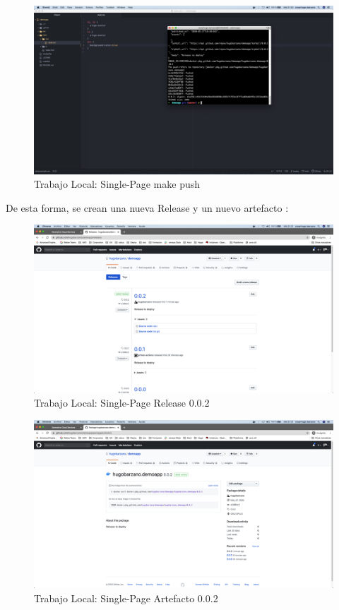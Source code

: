 \documentclass[a4paper,11pt]{book}
\begin{document}
   \begin{figure}[H]
\centering
\includegraphics[scale=0.2]{imagenes/casouso/3_6.png}
\caption{ Trabajo Local: Single-Page make push  }
\end{figure}

De esta forma, se crean una nueva Release y un nuevo artefacto :

   \begin{figure}[H]
\centering
\includegraphics[scale=0.2]{imagenes/casouso/3_7.png}
\caption{  Trabajo Local: Single-Page Release 0.0.2 }
\end{figure}

   \begin{figure}[H]
\centering
\includegraphics[scale=0.2]{imagenes/casouso/3_8.png}
\caption{ Trabajo Local: Single-Page Artefacto 0.0.2  }
\end{figure}
\end{document}
